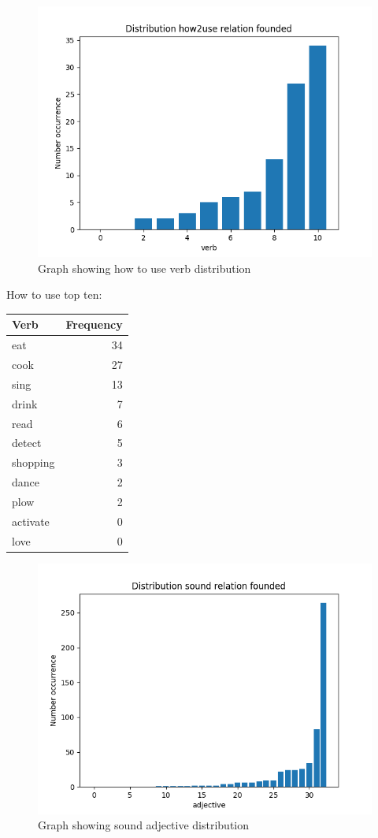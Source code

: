 \documentclass[conference,compsoc]{IEEEtran}
\begin{document}
\begin{figure}[h]
\centering
\includegraphics[scale=0.52]{how2use_plot}
\caption{ Graph showing how to use verb distribution}
\end{figure}

How to use  top ten: 
\begin{tabular}{lr}
\hline
 Verb     &   Frequency \\
\hline
 eat      &          34 \\
 cook     &          27 \\
 sing     &          13 \\
 drink    &           7 \\
 read     &           6 \\
 detect   &           5 \\
 shopping &           3 \\
 dance    &           2 \\
 plow     &           2 \\
 activate &           0 \\
 love     &           0 \\
\hline
\end{tabular}

\begin{figure}[h]
\centering
\includegraphics[scale=0.52]{sound_plot}
\caption{ Graph showing sound adjective distribution}
\end{figure}
\end{document}
